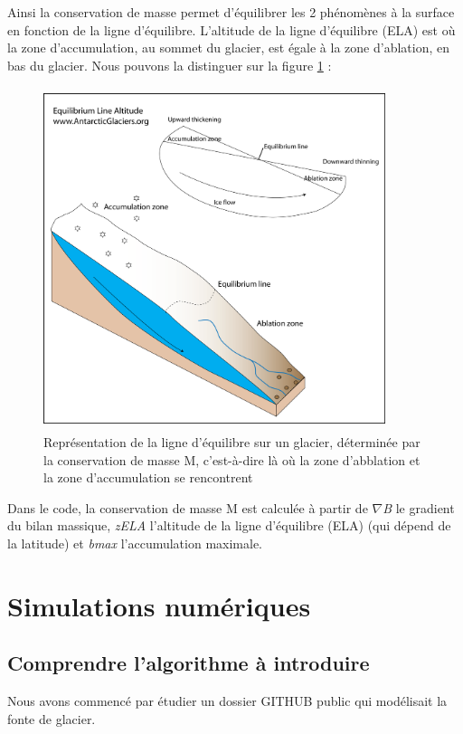 \documentclass{article}
\begin{document}
Ainsi la conservation de masse permet d'équilibrer les 2 phénomènes à la surface en fonction de la ligne d'équilibre. L'altitude de la ligne d'équilibre (ELA) est où la zone d'accumulation, au sommet du glacier, est égale à la zone d'ablation, en bas du glacier. Nous pouvons la distinguer sur la figure \ref{fig02} : 

\begin{figure}[!htpb]
\centering
\includegraphics[width=10cm, keepaspectratio=true, height=10cm]{equilibrium_line_altitude1.png}
\caption{Représentation de la ligne d'équilibre sur un glacier, déterminée par la conservation de masse M, c'est-à-dire là où la zone d'abblation et la zone d'accumulation se rencontrent}
\label{fig02}
\end{figure}



Dans le code, la conservation de masse M est calculée à partir de $ \nabla$\textit{B} le gradient du bilan massique, \textit{zELA} l'altitude de la ligne d'équilibre (ELA) (qui dépend de la latitude) et \textit{bmax} l'accumulation maximale.
\newpage
\section{Simulations numériques}

\subsection{Comprendre l'algorithme à introduire}
Nous avons commencé par étudier un dossier GITHUB public \cite{site2} qui modélisait la fonte de glacier.
\newline
\end{document}

